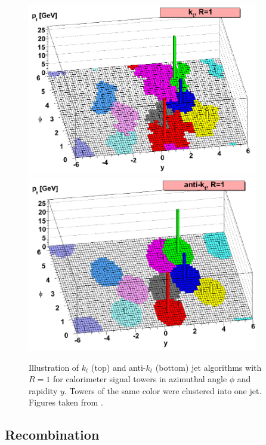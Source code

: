 \begin{figure}[p]
  \centering
  \includegraphics[width=0.9\textwidth]{Chapter2/JetRecombination1.png}
  \includegraphics[width=0.9\textwidth]{Chapter2/JetRecombination2.png}
  \caption[Illustration of $k_t$ (top) and anti-$k_t$ (bottom) jet algorithms with $R=1$ for
          calorimeter signal towers in azimuthal angle $\phi$ and rapidity $y$. Towers of
          the same color were clustered into one jet. ]
          {Illustration of $k_t$ (top) and anti-$k_t$ (bottom) jet algorithms with $R=1$ for
          calorimeter signal towers in azimuthal angle $\phi$ and rapidity $y$. Towers of
          the same color were clustered into one jet. Figures taken from
          \cite{JetTheoreticalPictures}.} 
  \label{fig:JetRecombination}
\end{figure}

\subsection{Recombination}
\label{sse:Recombination}

